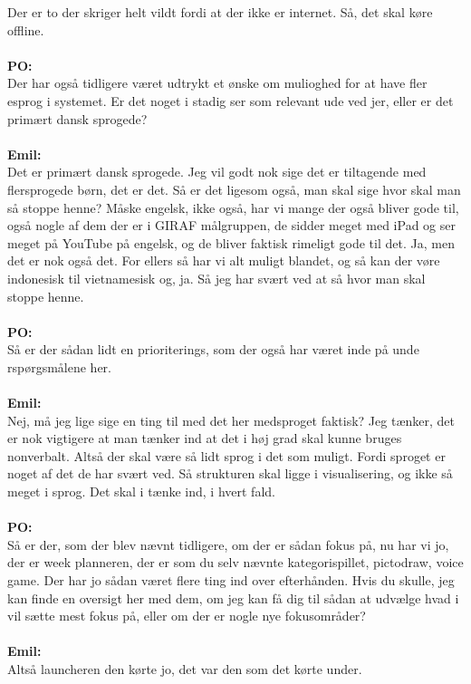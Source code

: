 Der er to der skriger helt vildt fordi at der ikke er internet.
Så, det skal køre offline.
\\\\
\textbf{PO:}\\
Der har også tidligere været udtrykt et ønske om mulioghed for at have fler esprog i systemet. Er det noget i stadig ser som relevant ude ved jer, eller er det primært dansk sprogede?
\\\\
\textbf{Emil:}\\
Det er primært dansk sprogede.
Jeg vil godt nok sige det er tiltagende med flersprogede børn, det er det.
Så er det ligesom også, man skal sige hvor skal man så stoppe henne?
Måske engelsk, ikke også, har vi mange der også bliver gode til, også nogle af dem der er i GIRAF målgruppen, de sidder meget med iPad og ser meget på YouTube på engelsk, og de bliver faktisk rimeligt gode til det.
Ja, men det er nok også det. 
For ellers så har vi alt muligt blandet, og så kan der vøre indonesisk til vietnamesisk og, ja.
Så jeg har svært ved at så hvor man skal stoppe henne.
\\\\
\textbf{PO:}\\
Så er der sådan lidt en prioriterings, som der også har været inde på unde rspørgsmålene her.
\\\\
\textbf{Emil:}\\
Nej, må jeg lige sige en ting til med det her medsproget faktisk?
Jeg tænker, det er nok vigtigere at man tænker ind at det i høj grad skal kunne bruges nonverbalt.
Altså der skal være så lidt sprog i det som muligt. 
Fordi sproget er noget af det de har svært ved.
Så strukturen skal ligge i visualisering, og ikke så meget i sprog.
Det skal i tænke ind, i hvert fald.
\\\\
\textbf{PO:}\\
Så er der, som der blev nævnt tidligere, om der er sådan fokus på, nu har vi jo, der er week planneren, der er som du selv nævnte kategorispillet, pictodraw, voice game.
Der har jo sådan været flere ting ind over efterhånden.
Hvis du skulle, jeg kan finde en oversigt her med dem, om jeg kan få dig til sådan at udvælge hvad i vil sætte mest fokus på, eller om der er nogle nye fokusområder?
\\\\
\textbf{Emil:}\\
Altså launcheren den kørte jo, det var den som det kørte under.
